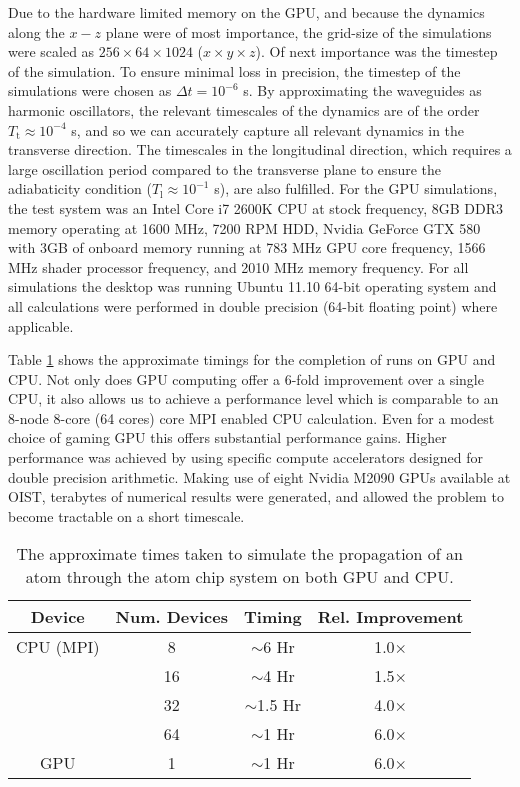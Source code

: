 Due to the hardware limited memory on the GPU, and because the dynamics along the $x-z$ plane were of most importance, the grid-size of the simulations were scaled as $256\times 64\times1024$ ($x\times y\times z$). Of next importance was the timestep of the simulation. To ensure minimal loss in precision, the timestep of the simulations were chosen as $\Delta t = 10^{-6}$ s. By approximating the waveguides as harmonic oscillators, the relevant timescales of the dynamics are of the order $T_{\textrm{t}}\approx 10^{-4}$ s, and so we can accurately capture all relevant dynamics in the transverse direction. The timescales in the longitudinal direction, which requires a large oscillation period compared to the transverse plane to ensure the adiabaticity condition ($T_{\textrm{l}}\approx 10^{-1}$ s), are also fulfilled. For the GPU simulations, the test system was an Intel Core i7 2600K CPU at stock frequency, 8GB DDR3 memory operating at 1600 MHz, 7200 RPM HDD, Nvidia GeForce GTX 580 with 3GB of onboard memory running at 783 MHz GPU core frequency, 1566 MHz shader processor frequency, and 2010 MHz memory frequency. For all simulations the desktop was running Ubuntu 11.10 64-bit operating system and all calculations were performed in double precision (64-bit floating point) where applicable.

Table \ref{tbl:timing} shows the approximate timings for the completion of runs on GPU and CPU. Not only does GPU computing offer a 6-fold improvement over a single CPU, it also allows us to achieve a performance level which is comparable to an 8-node 8-core (64 cores) core MPI enabled CPU calculation. Even for a modest choice of gaming GPU this offers substantial performance gains. Higher performance was achieved by using specific compute accelerators designed for double precision arithmetic. Making use of eight Nvidia M2090 GPUs available at OIST, terabytes of numerical results were generated, and allowed the problem to become tractable on a short timescale.

\begin{table}[tb]
  \begin{center}
    \begin{tabular}{|c||c|c|c|}
      \hline
      Device & Num. Devices & Timing  & Rel. Improvement \\ \hline
      CPU (MPI) & 8 & $\sim$6 Hr & 1.0$\times$ \\
      & 16 & $\sim$4 Hr & 1.5$\times$ \\
      & 32 & $\sim$1.5 Hr & 4.0$\times$ \\
      & 64 & $\sim$1 Hr & 6.0$\times$ \\ \hline
      GPU & 1 & $\sim$1 Hr & 6.0$\times$ \\ \hline
    \end{tabular}
  \end{center}
   \caption{The approximate times taken to simulate the propagation of an atom through the atom chip system on both GPU and CPU.}
   \label{tbl:timing}
\end{table}
